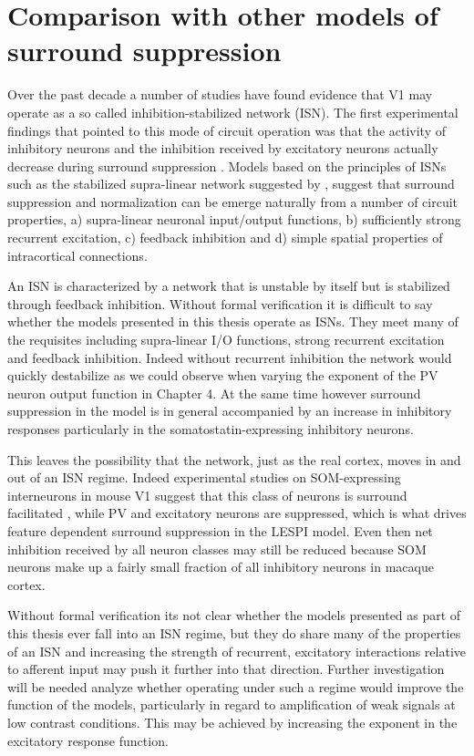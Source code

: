 \section{Comparison with other models of surround suppression}

Over the past decade a number of studies have found evidence that V1
may operate as a so called inhibition-stabilized network (ISN). The
first experimental findings that pointed to this mode of circuit
operation was that the activity of inhibitory neurons and the
inhibition received by excitatory neurons actually decrease during
surround suppression \citep{Ozeki2009b}. Models based on the
principles of ISNs such as the stabilized supra-linear network
suggested by \cite{Rubin2015}, suggest that surround suppression and
normalization can be emerge naturally from a number of circuit
properties, a) supra-linear neuronal input/output functions, b)
sufficiently strong recurrent excitation, c) feedback inhibition and
d) simple spatial properties of intracortical connections.

An ISN is characterized by a network that is unstable by itself but is
stabilized through feedback inhibition. Without formal verification it
is difficult to say whether the models presented in this thesis
operate as ISNs. They meet many of the requisites including
supra-linear I/O functions, strong recurrent excitation and feedback
inhibition. Indeed without recurrent inhibition the network would
quickly destabilize as we could observe when varying the exponent of
the PV neuron output function in Chapter 4. At the same time however
surround suppression in the model is in general accompanied by an
increase in inhibitory responses particularly in the
somatostatin-expressing inhibitory neurons.

This leaves the possibility that the network, just as the real cortex,
moves in and out of an ISN regime. Indeed experimental studies on
SOM-expressing interneurons in mouse V1 suggest that this class of
neurons is surround facilitated \citep{Adesnik2012}, while PV and
excitatory neurons are suppressed, which is what drives feature
dependent surround suppression in the LESPI model. Even then net
inhibition received by all neuron classes may still be reduced because
SOM neurons make up a fairly small fraction of all inhibitory neurons
in macaque cortex.

Without formal verification its not clear whether the models presented
as part of this thesis ever fall into an ISN regime, but they do share
many of the properties of an ISN and increasing the strength of
recurrent, excitatory interactions relative to afferent input may push
it further into that direction. Further investigation will be needed
analyze whether operating under such a regime would improve the
function of the models, particularly in regard to amplification of
weak signals at low contrast conditions. This may be achieved by
increasing the exponent in the excitatory response function.

